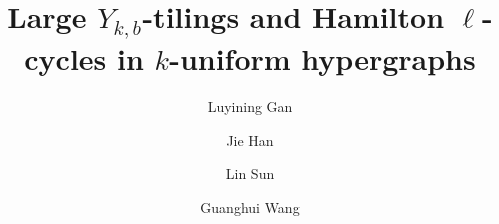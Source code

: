 \documentclass[11pt, reqno]{amsart}    	%
\theoremstyle{definition}
\numberwithin{equation}{section}
\begin{document}

	
	\title[$Y$-tilings and Hamilton $ \ell $-cycles]{Large $ Y_{k,b} $-tilings and  Hamilton $ \ell $-cycles in $k$-uniform hypergraphs }
	\author{Luyining Gan}
	\address{Department of Mathematics and Statistics, University of Nevada, Reno, Reno, NV, USA}
	
	\author{Jie Han}
	\address{School of Mathematics and Statistics, Beijing Institute of Technology, Beijing, China}
	\author{Lin Sun}
	\address{School of Mathematics, Shandong University,
		Jinan, China.}
	
	\author{Guanghui Wang}
	
\end{document}
